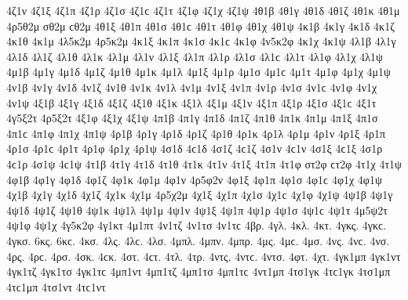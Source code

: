 {4ζ1ν
4ζ1ξ
4ζ1π
4ζ1ρ
4ζ1σ 4ζ1ϲ
4ζ1τ
4ζ1φ
4ζ1χ
4ζ1ψ
4θ1β
4θ1γ
4θ1δ
4θ1ζ
4θ1κ
4θ1μ
4ρ5θ2μ   %
σθ2μ ϲθ2μ   %
4θ1ξ
4θ1π
4θ1σ 4θ1ϲ
4θ1τ
4θ1φ
4θ1χ
4θ1ψ
4κ1β   %
4κ1γ
4κ1δ
4κ1ζ
4κ1θ
4κ1μ
4λ5κ2μ   %
4ρ5κ2μ   %
4κ1ξ
4κ1π
4κ1σ 4κ1ϲ
4κ1φ
4ν5κ2φ   %
4κ1χ
4κ1ψ
4λ1β
4λ1γ
4λ1δ
4λ1ζ
4λ1θ
4λ1κ
4λ1μ
4λ1ν
4λ1ξ
4λ1π
4λ1ρ
4λ1σ 4λ1ϲ
4λ1τ
4λ1φ
4λ1χ
4λ1ψ
4μ1β
4μ1γ
4μ1δ
4μ1ζ
4μ1θ
4μ1κ
4μ1λ
4μ1ξ
4μ1ρ
4μ1σ 4μ1ϲ
4μ1τ
4μ1φ
4μ1χ
4μ1ψ
4ν1β
4ν1γ
4ν1δ
4ν1ζ
4ν1θ
4ν1κ
4ν1λ
4ν1μ
4ν1ξ
4ν1π
4ν1ρ
4ν1σ 4ν1ϲ
4ν1φ
4ν1χ
4ν1ψ
4ξ1β
4ξ1γ
4ξ1δ
4ξ1ζ
4ξ1θ
4ξ1κ
4ξ1λ
4ξ1μ
4ξ1ν
4ξ1π
4ξ1ρ
4ξ1σ 4ξ1ϲ
4ξ1τ
4γ5ξ2τ   %
4ρ5ξ2τ   %
4ξ1φ
4ξ1χ
4ξ1ψ
4π1β
4π1γ
4π1δ
4π1ζ
4π1θ
4π1κ
4π1μ
4π1ξ
4π1σ 4π1ϲ
4π1φ
4π1χ
4π1ψ
4ρ1β
4ρ1γ
4ρ1δ
4ρ1ζ
4ρ1θ
4ρ1κ
4ρ1λ
4ρ1μ
4ρ1ν
4ρ1ξ
4ρ1π
4ρ1σ 4ρ1ϲ
4ρ1τ
4ρ1φ
4ρ1χ
4ρ1ψ
4σ1δ 4ϲ1δ   %
4σ1ζ 4ϲ1ζ
4σ1ν 4ϲ1ν   %
4σ1ξ 4ϲ1ξ
4σ1ρ 4ϲ1ρ
4σ1ψ 4ϲ1ψ
4τ1β
4τ1γ
4τ1δ
4τ1θ
4τ1κ
4τ1ν
4τ1ξ
4τ1π
4τ1φ
στ2φ ϲτ2φ   %
4τ1χ
4τ1ψ
4φ1β
4φ1γ
4φ1δ
4φ1ζ
4φ1κ   %
4φ1μ
4φ1ν
4ρ5φ2ν   %
4φ1ξ
4φ1π
4φ1σ 4φ1ϲ
4φ1χ
4φ1ψ
4χ1β
4χ1γ
4χ1δ
4χ1ζ
4χ1κ
4χ1μ
4ρ5χ2μ   %
4χ1ξ
4χ1π
4χ1σ 4χ1ϲ
4χ1φ
4χ1ψ
4ψ1β
4ψ1γ
4ψ1δ
4ψ1ζ
4ψ1θ
4ψ1κ
4ψ1λ
4ψ1μ
4ψ1ν
4ψ1ξ
4ψ1π
4ψ1ρ
4ψ1σ 4ψ1ϲ
4ψ1τ
4μ5ψ2τ   %
4ψ1φ
4ψ1χ
4γ5κ2φ   %
4γ1κτ   %
4μ1πτ   %
4ν1τζ   %
4ν1τσ 4ν1τϲ   %
4βρ.   %
4γλ.   %
4κλ.   %
4κτ.   %
4γκς. 4γκϲ.   %
4γκσ.
6κς. 6κϲ.   %
4κσ.
4λς. 4λϲ.   %
4λσ.
4μπλ.   %
4μπν.   %
4μπρ.   %
4μς. 4μϲ.   %
4μσ.
4νς. 4νϲ.   %
4νσ.
4ρς. 4ρϲ.   %
4ρσ.
4σκ. 4ϲκ.   %
4στ. 4ϲτ.   %
4τλ.   %
4τρ.   %
4ντς. 4ντϲ.   %
4ντσ.
4φτ.   %
4χτ.   %
4γκ1μπ
4γκ1ντ
4γκ1τζ
4γκ1τσ 4γκ1τϲ
4μπ1ντ
4μπ1τζ
4μπ1τσ 4μπ1τϲ
4ντ1μπ
4τσ1γκ 4τϲ1γκ
4τσ1μπ 4τϲ1μπ
4τσ1ντ 4τϲ1ντ
}


